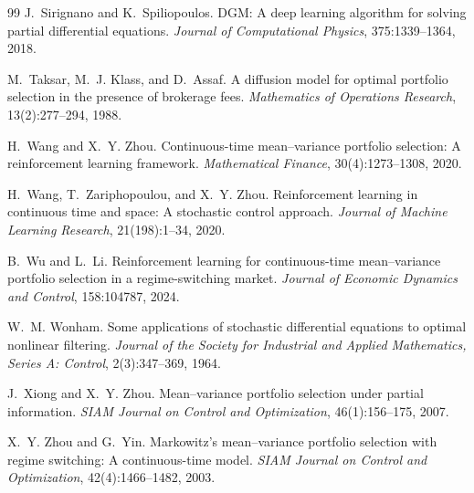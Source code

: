 \documentclass[a4paper,10pt]{article}
\begin{document}
\begin{thebibliography}{99}
J.~Sirignano and K.~Spiliopoulos.
DGM: A deep learning algorithm for solving partial differential equations.
\emph{Journal of Computational Physics}, 375:1339--1364, 2018.

M.~Taksar, M.~J. Klass, and D.~Assaf.
A diffusion model for optimal portfolio selection in the presence of brokerage fees.
\emph{Mathematics of Operations Research}, 13(2):277--294, 1988.

H.~Wang and X.~Y. Zhou.
Continuous-time mean--variance portfolio selection: A reinforcement learning framework.
\emph{Mathematical Finance}, 30(4):1273--1308, 2020.

H.~Wang, T.~Zariphopoulou, and X.~Y. Zhou.
Reinforcement learning in continuous time and space: A stochastic control approach.
\emph{Journal of Machine Learning Research}, 21(198):1--34, 2020.

B.~Wu and L.~Li.
Reinforcement learning for continuous-time mean--variance portfolio selection in a regime-switching market.
\emph{Journal of Economic Dynamics and Control}, 158:104787, 2024.

W.~M. Wonham.
Some applications of stochastic differential equations to optimal nonlinear filtering.
\emph{Journal of the Society for Industrial and Applied Mathematics, Series A: Control}, 2(3):347--369, 1964.

J.~Xiong and X.~Y. Zhou.
Mean--variance portfolio selection under partial information.
\emph{SIAM Journal on Control and Optimization}, 46(1):156--175, 2007.

X.~Y. Zhou and G.~Yin.
Markowitz's mean--variance portfolio selection with regime switching: A continuous-time model.
\emph{SIAM Journal on Control and Optimization}, 42(4):1466--1482, 2003.

\end{thebibliography}
\end{document}
